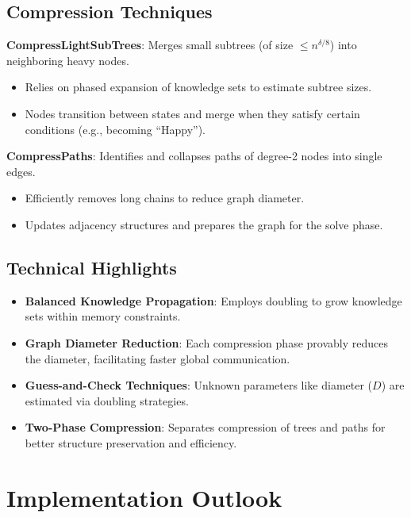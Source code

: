 \documentclass[11pt]{article}
\begin{document}
\subsection{Compression Techniques}
\textbf{CompressLightSubTrees}: Merges small subtrees (of size $\leq n^{\delta/8}$) into neighboring heavy nodes.

\begin{itemize}
    \item Relies on phased expansion of knowledge sets to estimate subtree sizes.
    \item Nodes transition between states and merge when they satisfy certain conditions (e.g., becoming ``Happy'').
\end{itemize}

\textbf{CompressPaths}: Identifies and collapses paths of degree-2 nodes into single edges.

\begin{itemize}
    \item Efficiently removes long chains to reduce graph diameter.
    \item Updates adjacency structures and prepares the graph for the solve phase.
\end{itemize}

\subsection{Technical Highlights}
\begin{itemize}
    \item \textbf{Balanced Knowledge Propagation}: Employs doubling to grow knowledge sets within memory constraints.
    \item \textbf{Graph Diameter Reduction}: Each compression phase provably reduces the diameter, facilitating faster global communication.
    \item \textbf{Guess-and-Check Techniques}: Unknown parameters like diameter ($D$) are estimated via doubling strategies.
    \item \textbf{Two-Phase Compression}: Separates compression of trees and paths for better structure preservation and efficiency.
\end{itemize}


\section{Implementation Outlook}
\end{document}
